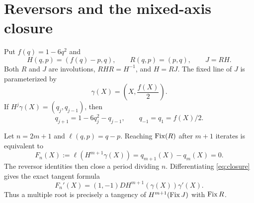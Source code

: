 \section{Reversors and the mixed-axis closure}

Put $f(q)=1-6q^2$ and
\[
H(q,p)=(f(q)-p,q),\qquad R(q,p)=(p,q),\qquad J=RH.
\]
Both $R$ and $J$ are involutions, $RHR=H^{-1}$, and $H=RJ$.  The fixed line
of $J$ is parameterized by
\[
\gamma(X)=\left(X,\frac{f(X)}2\right).
\]
If $H^j\gamma(X)=(q_j,q_{j-1})$, then
\[
q_{j+1}=1-6q_j^2-q_{j-1},\qquad q_{-1}=q_1=f(X)/2.
\]

Let $n=2m+1$ and $\ell(q,p)=q-p$.  Reaching $\operatorname{Fix}(R)$ after $m+1$
iterates is equivalent to
\begin{equation}\label{eq:closure}
F_n(X):=\ell(H^{m+1}\gamma(X))=q_{m+1}(X)-q_m(X)=0.
\end{equation}
The reversor identities then close a period dividing $n$.  Differentiating
\eqref{eq:closure} gives the exact tangent formula
\begin{equation}\label{eq:tangent}
F_n'(X)=(1,-1)DH^{m+1}(\gamma(X))\gamma'(X).
\end{equation}
Thus a multiple root is precisely a tangency of
$H^{m+1}(\operatorname{Fix} J)$ with $\operatorname{Fix} R$.
